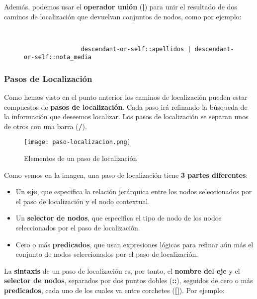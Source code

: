 Además, podemos usar el \textbf{operador unión} (\textbf{|}) para unir el resultado de dos caminos de localización que devuelvan conjuntos de nodos, como por ejemplo:

\begin{figure}[H]
    \begin{tcolorbox}[sharp corners, colback=yellow!30, colframe=white!20]
        \scriptsize
        \begin{verbatim}


                descendant-or-self::apellidos | descendant-or-self::nota_media
        \end{verbatim}
    \end{tcolorbox}
\end{figure}

\subsubsection{Pasos de Localización}
Como hemos visto en el punto anterior los caminos de localización pueden estar compuestos de \textbf{pasos de localización}. Cada paso irá refinando la búsqueda de la información que deseemos localizar. Los pasos de localización se separan unos de otros con una barra (\textbf{/}).

\begin{figure}[H]
    \centering
    \texttt{[image: paso-localizacion.png]}
    \caption{Elementos de un paso de localización}
\end{figure}

Como vemos en la imagen, una paso de localización tiene \textbf{3 partes diferentes}:

\begin{itemize}
    \item Un \textbf{eje}, que especifica la relación jerárquica entre los nodos seleccionados por el paso de localización y el nodo contextual.
    \item Un \textbf{selector de nodos}, que especifica el tipo de nodo de los nodos seleccionados por el paso de localización.
    \item Cero o más \textbf{predicados}, que usan expresiones lógicas para refinar aún más el conjunto de nodos seleccionados por el paso de localización.
\end{itemize}

La \textbf{sintaxis} de un paso de localización es, por tanto, el \textbf{nombre del eje} y el \textbf{selector de nodos}, separados por dos puntos dobles (\textbf{::}), seguidos de cero o más \textbf{predicados}, cada uno de los cuales va entre corchetes (\textbf{[]}). Por ejemplo:

